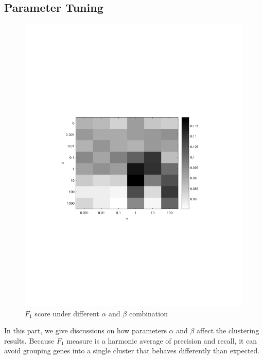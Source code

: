 \documentclass{bmcart}
\begin{document}
\subsection*{\textbf{Parameter Tuning}}
\begin{figure}[!h]
  \begin{minipage}[t]{0.7\linewidth}
    \includegraphics[width=\linewidth,origin = l]{DrawPictures/alpha-gama.pdf}
  \end{minipage}
  \caption{$F_1$ score under different $\alpha$ and $\beta$ combination}
  \label{fig:alpha_gamma}
\end{figure}

In this part, we give discussions on how parameters $\alpha$ and $\beta$ affect the clustering results. Because $F_1$ measure is a  harmonic average of precision and recall, it can avoid grouping genes into a single cluster that behaves differently than expected.
\end{document}
